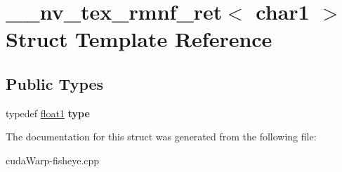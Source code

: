 \hypertarget{struct____nv__tex__rmnf__ret_3_01char1_01_4}{}\section{\+\_\+\+\_\+nv\+\_\+tex\+\_\+rmnf\+\_\+ret$<$ char1 $>$ Struct Template Reference}
\label{struct____nv__tex__rmnf__ret_3_01char1_01_4}
\subsection*{Public Types}
\begin{DoxyCompactItemize}
\item 
typedef \hyperlink{structfloat1}{float1} {\bfseries type}\hypertarget{struct____nv__tex__rmnf__ret_3_01char1_01_4_a2a1e9a4b74e47a62dbd019b167bdc66e}{}\label{struct____nv__tex__rmnf__ret_3_01char1_01_4_a2a1e9a4b74e47a62dbd019b167bdc66e}

\end{DoxyCompactItemize}


The documentation for this struct was generated from the following file\+:\begin{DoxyCompactItemize}
\item 
cuda\+Warp-\/fisheye.\+cpp\end{DoxyCompactItemize}
